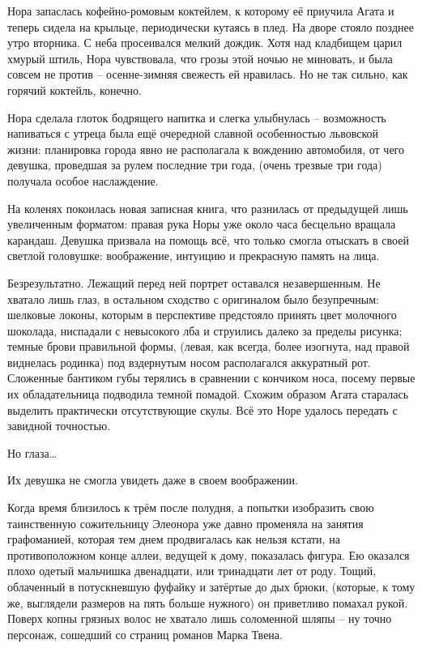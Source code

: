 \documentclass[
  a5paperpaper,
  DIV=11,
  numbers=noendperiod]{scrreprt}
\begin{document}
Нора запаслась кофейно-ромовым коктейлем, к которому её приучила Агата и
теперь сидела на крыльце, периодически кутаясь в плед. На дворе стояло
позднее утро вторника. С неба просеивался мелкий дождик. Хотя над
кладбищем царил хмурый штиль, Нора чувствовала, что грозы этой ночью не
миновать, и была совсем не против -- осенне-зимняя свежесть ей
нравилась. Но не так сильно, как горячий коктейль, конечно.

Нора сделала глоток бодрящего напитка и слегка улыбнулась -- возможность
напиваться с утреца была ещё очередной славной особенностью львовской
жизни: планировка города явно не располагала к вождению автомобиля, от
чего девушка, проведшая за рулем последние три года, (очень трезвые три
года) получала особое наслаждение.

На коленях покоилась новая записная книга, что разнилась от предыдущей
лишь увеличенным форматом: правая рука Норы уже около часа бесцельно
вращала карандаш. Девушка призвала на помощь всё, что только смогла
отыскать в своей светлой головушке: воображение, интуицию и прекрасную
память на лица.

Безрезультатно. Лежащий перед ней портрет оставался незавершенным. Не
хватало лишь глаз, в остальном сходство с оригиналом было безупречным:
шелковые локоны, которым в перспективе предстояло принять цвет молочного
шоколада, ниспадали с невысокого лба и струились далеко за пределы
рисунка; темные брови правильной формы, (левая, как всегда, более
изогнута, над правой виднелась родинка) под вздернутым носом
располагался аккуратный рот. Сложенные бантиком губы терялись в
сравнении с кончиком носа, посему первые их обладательница подводила
темной помадой. Схожим образом Агата старалась выделить практически
отсутствующие скулы. Всё это Норе удалось передать с завидной точностью.

Но глаза\ldots{}

Их девушка не смогла увидеть даже в своем воображении.

Когда время близилось к трём после полудня, а попытки изобразить свою
таинственную сожительницу Элеонора уже давно променяла на занятия
графоманией, которая тем днем продвигалась как нельзя кстати, на
противоположном конце аллеи, ведущей к дому, показалась фигура. Ею
оказался плохо одетый мальчишка двенадцати, или тринадцати лет от роду.
Тощий, облаченный в потускневшую фуфайку и затёртые до дых брюки,
(которые, к тому же, выглядели размеров на пять больше нужного) он
приветливо помахал рукой. Поверх копны грязных волос не хватало лишь
соломенной шляпы -- ну точно персонаж, сошедший со страниц романов Марка
Твена.
\end{document}
